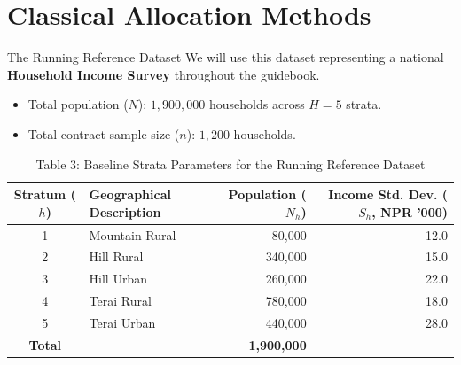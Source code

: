 \documentclass[10pt, aspectratio=169]{beamer}
\begin{document}
  \section{Classical Allocation Methods}
  
  \begin{frame}{The Running Reference Dataset}
      We will use this dataset representing a national \textbf{Household Income Survey} throughout the guidebook.
      
      \begin{itemize}
          \item Total population ($N$): $1,900,000$ households across $H=5$ strata.
          \item Total contract sample size ($n$): $1,200$ households.
      \end{itemize}
      
      \begin{table}
          \caption{Table 3: Baseline Strata Parameters for the Running Reference Dataset}
          \footnotesize
          \begin{tabularx}{0.85\textwidth}{clrr}
              \toprule
              \textbf{Stratum ($h$)} & \textbf{Geographical Description} & \textbf{Population ($N_h$)} & \textbf{Income Std. Dev. ($S_h$, NPR '000)} \\
              \midrule
              1 & Mountain Rural & 80,000 & 12.0 \\
              2 & Hill Rural & 340,000 & 15.0 \\
              3 & Hill Urban & 260,000 & 22.0 \\
              4 & Terai Rural & 780,000 & 18.0 \\
              5 & Terai Urban & 440,000 & 28.0 \\
              \midrule
              \textbf{Total} & & \textbf{1,900,000} & \\
              \bottomrule
          \end{tabularx}
      \end{table}
  \end{frame}
  
\end{document}
